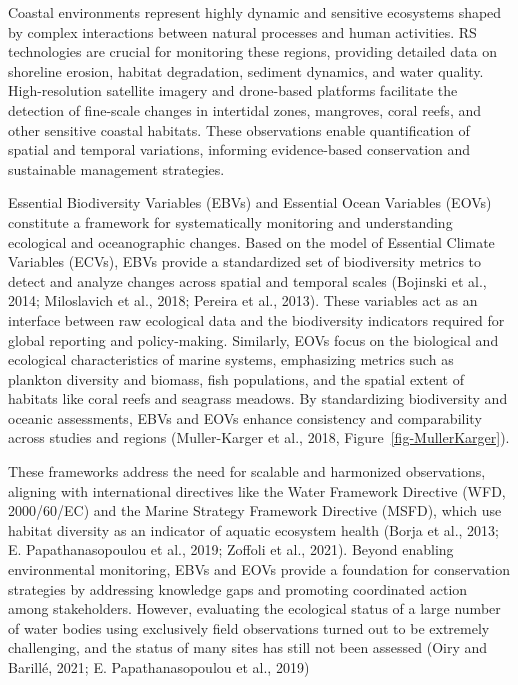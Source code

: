 \documentclass[
  letterpaper,
  11pt,
  english,
  singlespacing,
  headsepline]{MastersDoctoralThesis}
\begin{document}
\begin{spacing}{1.5}
Coastal environments represent highly dynamic and sensitive ecosystems
shaped by complex interactions between natural processes and human
activities. RS technologies are crucial for monitoring these regions,
providing detailed data on shoreline erosion, habitat degradation,
sediment dynamics, and water quality. High-resolution satellite imagery
and drone-based platforms facilitate the detection of fine-scale changes
in intertidal zones, mangroves, coral reefs, and other sensitive coastal
habitats. These observations enable quantification of spatial and
temporal variations, informing evidence-based conservation and
sustainable management strategies.

Essential Biodiversity Variables (EBVs) and Essential Ocean Variables
(EOVs) constitute a framework for systematically monitoring and
understanding ecological and oceanographic changes. Based on the model
of Essential Climate Variables (ECVs), EBVs provide a standardized set
of biodiversity metrics to detect and analyze changes across spatial and
temporal scales (Bojinski et al., 2014; Miloslavich et al., 2018;
Pereira et al., 2013). These variables act as an interface between raw
ecological data and the biodiversity indicators required for global
reporting and policy-making. Similarly, EOVs focus on the biological and
ecological characteristics of marine systems, emphasizing metrics such
as plankton diversity and biomass, fish populations, and the spatial
extent of habitats like coral reefs and seagrass meadows. By
standardizing biodiversity and oceanic assessments, EBVs and EOVs
enhance consistency and comparability across studies and regions
(Muller-Karger et al., 2018, Figure~\ref{fig-MullerKarger}).

These frameworks address the need for scalable and harmonized
observations, aligning with international directives like the Water
Framework Directive (WFD, 2000/60/EC) and the Marine Strategy Framework
Directive (MSFD), which use habitat diversity as an indicator of aquatic
ecosystem health (Borja et al., 2013; E. Papathanasopoulou et al., 2019;
Zoffoli et al., 2021). Beyond enabling environmental monitoring, EBVs
and EOVs provide a foundation for conservation strategies by addressing
knowledge gaps and promoting coordinated action among stakeholders.
However, evaluating the ecological status of a large number of water
bodies using exclusively field observations turned out to be extremely
challenging, and the status of many sites has still not been assessed
(Oiry and Barillé, 2021; E. Papathanasopoulou et al., 2019)


\end{spacing}
\end{document}
